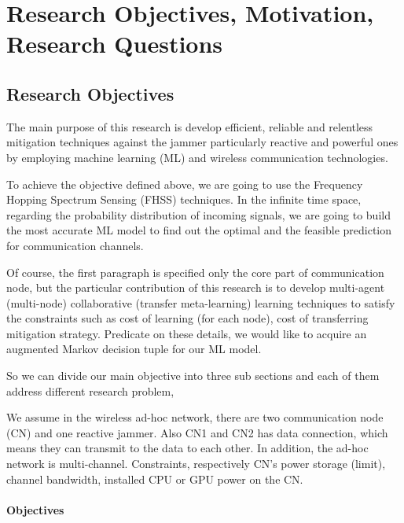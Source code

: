 \documentclass[letterpaper%
, twoside%
, 12pt%
,thesepararticles%
, english%
,creativecommons,hyperref, withAlgo2e%
]{thETS}
\begin{document}

\chapter{Research Objectives, Motivation, Research Questions}

\section{Research Objectives}

The main purpose of this research is develop efficient, reliable and relentless mitigation techniques against the jammer particularly reactive and powerful ones by employing machine learning (ML) and wireless communication technologies. 

To achieve the objective defined above, we are going to use the Frequency Hopping Spectrum  Sensing (FHSS) techniques. In the infinite time space, regarding the probability distribution of incoming signals, we are going to build the most accurate ML model to find out  the optimal and the feasible prediction for communication channels.

Of course, the first paragraph is specified only the core part of communication node, but the particular contribution of this research is to develop multi-agent (multi-node) collaborative (transfer meta-learning) learning techniques to satisfy the constraints such as cost of learning (for each node), cost of transferring mitigation strategy. Predicate on these details, we would like to acquire an augmented Markov decision tuple for our ML model.

So we can divide our main objective into three sub sections and each of them address different research problem, 

We assume in the wireless ad-hoc network, there are two communication node (CN) and one reactive jammer. Also CN1 and CN2 has data connection, which means they can transmit to the data to each other. In addition, the ad-hoc network is multi-channel. Constraints, respectively CN's power storage (limit), channel bandwidth, installed CPU or GPU power on the CN. 

\subsubsection{Objectives}
\end{document}
